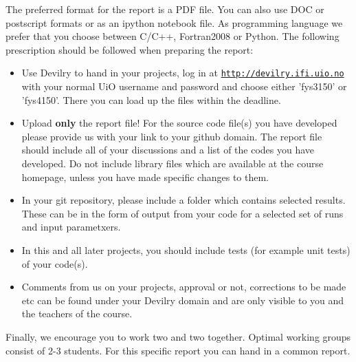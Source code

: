 \documentclass[%
oneside,                 %
final,                   %
10pt]{article}
\begin{document}
The preferred format for the report is a PDF file. You can also use DOC or postscript formats or as an ipython notebook file.  As programming language we prefer that you choose between C/C++, Fortran2008 or Python. The following prescription should be followed when preparing the report:

\begin{itemize}
  \item Use Devilry to hand in your projects, log in  at  \href{{http://devilry.ifi.uio.no}}{\nolinkurl{http://devilry.ifi.uio.no}} with your normal UiO username and password and choose either 'fys3150' or 'fys4150'. There you can load up the files within the deadline.

  \item Upload \textbf{only} the report file!  For the source code file(s) you have developed please provide us with your link to your github domain.  The report file should include all of your discussions and a list of the codes you have developed.  Do not include library files which are available at the course homepage, unless you have made specific changes to them.

  \item In your git repository, please include a folder which contains selected results. These can be in the form of output from your code for a selected set of runs and input parametxers.

  \item In this and all later projects, you should include tests (for example unit tests) of your code(s).

  \item Comments  from us on your projects, approval or not, corrections to be made  etc can be found under your Devilry domain and are only visible to you and the teachers of the course.
\end{itemize}

\noindent
Finally, 
we encourage you to work two and two together. Optimal working groups consist of 
2-3 students. For this specific report you can  hand in a common report.














\end{document}
